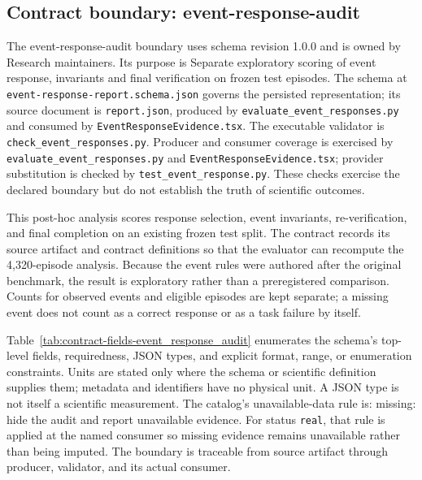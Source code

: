 \subsection{Contract boundary: event-response-audit}\label{sec:contract-event_response_audit}
The event-response-audit boundary uses schema revision 1.0.0 and is owned by Research maintainers. Its purpose is Separate exploratory scoring of event response, invariants and final verification on frozen test episodes. The schema at \texttt{event-response-report.schema.json} governs the persisted representation; its source document is \texttt{report.json}, produced by \texttt{evaluate\_\allowbreak{}event\_\allowbreak{}responses.py} and consumed by \texttt{Event\allowbreak{}Response\allowbreak{}Evidence.tsx}. The executable validator is \texttt{check\_\allowbreak{}event\_\allowbreak{}responses.py}. Producer and consumer coverage is exercised by \texttt{evaluate\_\allowbreak{}event\_\allowbreak{}responses.py} and \texttt{Event\allowbreak{}Response\allowbreak{}Evidence.tsx}; provider substitution is checked by \texttt{test\_\allowbreak{}event\_\allowbreak{}response.py}. These checks exercise the declared boundary but do not establish the truth of scientific outcomes.

This post-hoc analysis scores response selection, event invariants, re-verification, and final completion on an existing frozen test split. The contract records its source artifact and contract definitions so that the evaluator can recompute the 4,320-episode analysis. Because the event rules were authored after the original benchmark, the result is exploratory rather than a preregistered comparison. Counts for observed events and eligible episodes are kept separate; a missing event does not count as a correct response or as a task failure by itself.

Table~\ref{tab:contract-fields-event_response_audit} enumerates the schema's top-level fields, requiredness, JSON types, and explicit format, range, or enumeration constraints. Units are stated only where the schema or scientific definition supplies them; metadata and identifiers have no physical unit. A JSON type is not itself a scientific measurement. The catalog's unavailable-data rule is: missing: hide the audit and report unavailable evidence. For status \texttt{real}, that rule is applied at the named consumer so missing evidence remains unavailable rather than being imputed. The boundary is traceable from source artifact through producer, validator, and its actual consumer.

